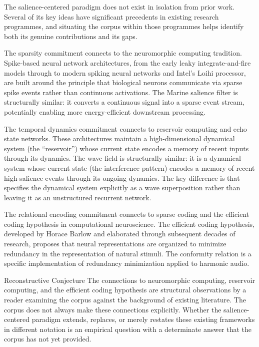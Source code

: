 The salience-centered paradigm does not exist in isolation
from prior work. Several of its key ideas have significant
precedents in existing research programmes, and situating
the corpus within those programmes helps identify both its
genuine contributions and its gaps.

The sparsity commitment connects to the neuromorphic computing
tradition. Spike-based neural network architectures, from
the early leaky integrate-and-fire models through to modern
spiking neural networks and Intel's Loihi processor, are
built around the principle that biological neurons communicate
via sparse spike events rather than continuous activations.
The Marine salience filter is structurally similar: it converts
a continuous signal into a sparse event stream, potentially
enabling more energy-efficient downstream processing.

The temporal dynamics commitment connects to reservoir
computing and echo state networks. These architectures
maintain a high-dimensional dynamical system (the
``reservoir'') whose current state encodes a memory of
recent inputs through its dynamics. The \MEMeight{} wave
field is structurally similar: it is a dynamical system
whose current state (the interference pattern) encodes
a memory of recent high-salience events through its
ongoing dynamics. The key difference is that \MEMeight{}
specifies the dynamical system explicitly as a wave
superposition rather than leaving it as an unstructured
recurrent network.

The relational encoding commitment connects to sparse
coding and the efficient coding hypothesis in computational
neuroscience. The efficient coding hypothesis, developed
by Horace Barlow and elaborated through subsequent decades
of research, proposes that neural representations are
organized to minimize redundancy in the representation
of natural stimuli. The \HCFone{} conformity relation is
a specific implementation of redundancy minimization applied
to harmonic audio.

\begin{epistemicstatus}{Reconstructive Conjecture}
The connections to neuromorphic computing, reservoir computing,
and the efficient coding hypothesis are structural observations
by a reader examining the corpus against the background of
existing literature. The corpus does not always make these
connections explicitly. Whether the salience-centered paradigm
extends, replaces, or merely restates these existing frameworks
in different notation is an empirical question with a determinate
answer that the corpus has not yet provided.
\end{epistemicstatus}


